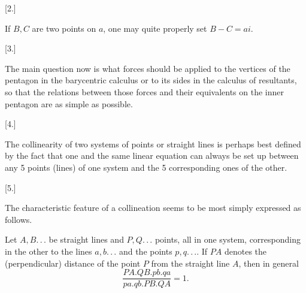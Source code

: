 \begin{center}
[2.]
\end{center}

If $B, C$ are two points on $a$, one may quite properly set $B - C = ai$.

\begin{center}
[3.]
\end{center}

The main question now is what forces should be applied to the vertices of the pentagon in the barycentric calculus or to its sides in the calculus of resultants, so that the relations between those forces and their equivalents on the inner pentagon are as simple as possible.

\begin{center}
[4.]
\end{center}

The collinearity of two systems of points or straight lines is perhaps best defined by the fact that one and the same linear equation can always be set up between any 5 points (lines) of one system and the 5 corresponding ones of the other.

\begin{center}
[5.]
\end{center}

The characteristic feature of a collineation seems to be most simply expressed as follows.

Let $A, B.\,.\,.$ be straight lines and $P,Q.\,.\,.$ points, all in one system, corresponding in the other to the lines $a,b.\,.\,.$ and the points $p,q.\,.\,.$. If $PA$ denotes the (perpendicular) distance of the point $P$ from the straight line $A$, then in general
\[
\frac{PA.QB.pb.qa}{pa.qb.PB.QA} = 1.
\]
